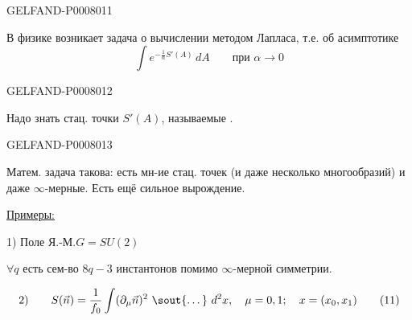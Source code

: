 \begin{GelfandAdjacentEvidence}{GELFAND-P000801}{1}

В физике возникает задача о вычислении методом Лапласа, т.е. об асимптотике
\begin{equation*}
\int e^{-\frac{1}{\alpha}S'(A)}\,dA\qquad
\text{при }\alpha\to0
\tag{10}
\end{equation*}
\end{GelfandAdjacentEvidence}
\begin{GelfandAdjacentEvidence}{GELFAND-P000801}{2}


Надо знать стац. точки \(S'(A)\), называемые .
\end{GelfandAdjacentEvidence}
\begin{GelfandAdjacentEvidence}{GELFAND-P000801}{3}


Матем. задача такова: есть мн-ие стац. точек (и даже несколько многообразий) и даже \(\infty\)-мерные. Есть ещё сильное вырождение.

\underline{Примеры:}

1) Поле Я.-М.\qquad \(G=SU(2)\)

\(\forall q\) есть сем-во \(8q-3\) инстантонов помимо \(\infty\)-мерной симметрии.

\begin{equation*}
2)\qquad S(\vec n)=\frac{1}{f_0}\int(\partial_\mu\vec n)^2
\ \text{\sout{\ldots}}\ d^2x,
\quad \mu=0,1;\quad x=(x_0,x_1)
\tag{11}
\end{equation*}
\end{GelfandAdjacentEvidence}
